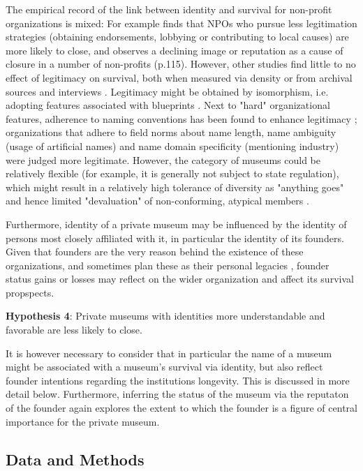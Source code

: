 \documentclass[12pt]{article}
\begin{document}
The empirical record of the link between identity and survival for non-profit organizations is mixed: 
For example \textcite{Bielefeld_1994_survival} finds that NPOs who pursue less legitimation strategies (obtaining endorsements, lobbying or contributing to local causes) are more likely to close, and \textcite{HernandezOrtiz_2022_discontinuity} observes a declining image or reputation as a cause of closure in a number of non-profits (p.115).
However, other studies find little to no effect of legitimacy on survival, both when measured via density \parencite{Bogaert_etal_2014_ecological} or from archival sources and interviews \parencite{Fernandez_2007_dissolution}.
Legitimacy might be obtained by isomorphism, i.e. adopting features associated with blueprints \parencite{diMaggio_1983_iron}.
Next to "hard" organizational features, adherence to naming conventions has been found to enhance legitimacy \parencite{Glynn_Abzug_2002_names}; organizations that adhere to field norms about name length, name ambiguity (usage of artificial names) and name domain specificity (mentioning industry) were judged more legitimate. 
However, the category of museums could be relatively flexible (for example, it is generally not subject to state regulation), which might result in a relatively high tolerance of diversity as "anything goes" and hence limited "devaluation" of non-conforming, atypical members \parencite{Bogaert_etal_2014_ecological}.


Furthermore, identity of a private museum may be influenced by the identity of persons most closely affiliated with it, in particular the identity of its founders.
Given that founders are the very reason behind the existence of these organizations, and sometimes plan these as their personal legacies \parencite{Walker_2019_collector}, founder status gains or losses may reflect on the wider organization and affect its survival propspects.


\bigbreak
\noindent
\textbf{Hypothesis 4}: Private museums with identities more understandable and favorable are less likely to close. 


It is however necessary to consider that in particular the name of a museum might be associated with a museum's survival via identity, but also reflect founder intentions regarding the institutions longevity.
This is discussed in more detail below.
Furthermore, inferring the status of the museum via the reputaton of the founder again explores the extent to which the founder is a figure of central importance for the private museum.
\subsection*{Data and Methods}
\end{document}
